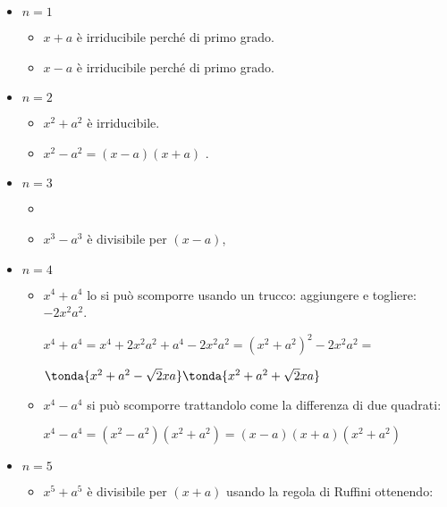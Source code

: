 \begin{itemize}[nosep]
\item \(n=1\)
\begin{itemize}[nosep]
\item \(x+a\) è irriducibile perché di primo grado.
\item \(x-a\) è irriducibile perché di primo grado.
\end{itemize}

\item \(n=2\)
\begin{itemize}[nosep]
\item \(x^2+a^2\) è irriducibile.
\item \(x^2-a^2=(x-a)(x+a)\) .
\end{itemize}

\item \(n=3\)
\begin{itemize}[nosep]
\item \myp
{}

\item \myp
\(x^3-a^3\) è divisibile per \((x-a)\),\\ 
\end{itemize}

\item \(n=4\)
\begin{itemize}[nosep]
\item \(x^4+a^4\) lo si può scomporre usando un trucco: 
aggiungere e togliere:~\(-2x^2a^2\).

\(x^4+a^4 = x^4+2x^2a^2+a^4-2x^2a^2 = (x^2+a^2)^2-2x^2a^2=\)

\(\tonda{x^2+a^2-\sqrt{2}xa}\tonda{x^2+a^2+\sqrt{2}xa}\)

\item \(x^4-a^4\) si può scomporre trattandolo come la differenza di due 
quadrati:

\(x^4-a^4 = (x^2-a^2)(x^2+a^2) = (x-a)(x+a)(x^2+a^2) \)
\end{itemize}

\item \(n=5\)
\begin{itemize}[nosep]
\item \(x^5+a^5\) è divisibile per \((x+a)\) usando la regola di Ruffini
ottenendo: 


\end{itemize}
\end{itemize}
